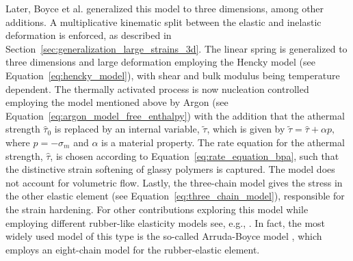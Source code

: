 Later, Boyce et al. \citep{boyceLargeInelasticDeformation1988} generalized this model to three dimensions, among other additions.
A multiplicative kinematic split between the elastic and inelastic deformation is enforced, as described in Section~\ref{sec:generalization_large_strains_3d}.
The linear spring is generalized to three dimensions and large deformation employing the Hencky model (see Equation~\eqref{eq:hencky_model}), with shear and bulk modulus being temperature dependent.
The thermally activated process is now nucleation controlled employing the model mentioned above by Argon \citep{argonTheoryLowtemperaturePlastic1973} (see Equation~\eqref{eq:argon_model_free_enthalpy}) with the addition that the athermal strength $\hat \tau_0$ is replaced by an internal variable, $\tilde \tau$, which is given by $\tilde{\tau}=\hat \tau+\alpha p,$ where $p=-\sigma_m$ and $\alpha$ is a material property.
The rate equation for the athermal strength, $\hat \tau$, is chosen according to Equation~\eqref{eq:rate_equation_bpa}, such that the distinctive strain softening of glassy polymers is captured.
The model does not account for volumetric flow.
Lastly, the three-chain model gives the stress in the other elastic element (see Equation~\eqref{eq:three_chain_model}), responsible for the strain hardening.
For other contributions exploring this model while employing different rubber-like elasticity models see, e.g., \cite{arrudaEvolutionPlasticAnisotropy1993, arrudaEffectsStrainRate1995, wuImprovedNetworkModels1993, buckleyGlassrubberConstitutiveModel1995, sweeneyRateDependentNetwork1995}.
In fact, the most widely used model of this type is the so-called Arruda-Boyce model \citep{arrudaEvolutionPlasticAnisotropy1993, arrudaEffectsStrainRate1995}, which employs an eight-chain model for the rubber-elastic element.


